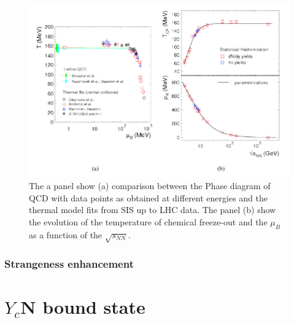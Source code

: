 \documentclass[12pt,a4paper]{book}
\begin{document}
\begin{figure}
\begin{minipage}{0.5\textwidth}
			\label{fig:particle_abbundance}
		\end{minipage}%
		\centering
			\includegraphics[width=0.74 \linewidth]{pictures/shm_qcd_comparison.png}
		\caption{ The a panel show (a) comparison between the Phase diagram of QCD with data points as obtained at different energies and the thermal model fits from SIS up to LHC data. The panel (b) show the evolution of the temperature of chemical freeze-out and the $\mu_B$ as a function of the $\sqrt{s_{NN}}$.\cite{Andronic_2017}}
		\label{fig:shm_qcd_comparison}
		
	\end{figure}
	
	\subsection{Strangeness enhancement}

	
	
	
	
	\FloatBarrier
    \chapter{$Y_c$N bound state}
	
\end{document}
